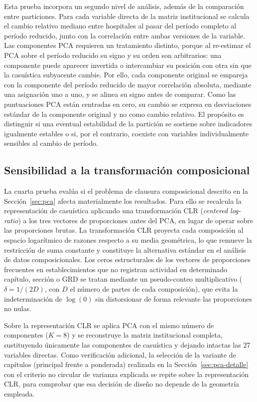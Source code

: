 Esta prueba incorpora un segundo nivel de análisis, además de la comparación
entre particiones. Para cada variable directa de la matriz institucional se
calcula el cambio relativo mediano entre hospitales al pasar del período completo
al período reducido, junto con la correlación entre ambas versiones de la
variable. Las componentes PCA requieren un tratamiento distinto, porque al
re-estimar el PCA sobre el período reducido su signo y su orden son arbitrarios:
una componente puede aparecer invertida o intercambiar su posición con otra sin
que la casuística subyacente cambie. Por ello, cada componente original se
empareja con la componente del período reducido de mayor correlación absoluta,
mediante una asignación uno a uno, y se alinea su signo antes de comparar. Como
las puntuaciones PCA están centradas en cero, su cambio se expresa en
desviaciones estándar de la componente original y no como cambio relativo. El
propósito es distinguir si una eventual estabilidad de la partición se sostiene
sobre indicadores igualmente estables o si, por el contrario, coexiste con
variables individualmente sensibles al cambio de período.

\subsection{Sensibilidad a la transformación composicional}
\label{sec:sensibilidad-composicional}

La cuarta prueba evalúa si el problema de clausura composicional descrito en la
Sección~\ref{sec:pca} afecta materialmente los resultados. Para ello se recalcula
la representación de casuística aplicando una transformación CLR
(\textit{centered log-ratio}) a los tres vectores de proporciones antes del PCA,
en lugar de operar sobre las proporciones brutas. La transformación CLR proyecta
cada composición al espacio logarítmico de razones respecto a su media
geométrica, lo que remueve la restricción de suma constante y constituye la
alternativa estándar en el análisis de datos composicionales. Los ceros
estructurales de los vectores de proporciones frecuentes en establecimientos
que no registran actividad en determinado capítulo, sección o GRD se tratan
mediante un pseudo-conteo multiplicativo ($\delta = 1/(2D)$, con $D$ el número de
partes de cada composición), que evita la indeterminación de $\log(0)$ sin
distorsionar de forma relevante las proporciones no nulas.

Sobre la representación CLR se aplica PCA con el mismo número de componentes
($K=8$) y se reconstruye la matriz institucional completa, sustituyendo
únicamente las componentes de casuística y dejando intactas las 27 variables
directas. Como verificación adicional, la selección de la variante de capítulos
(principal frente a ponderada) realizada en la Sección~\ref{sec:pca-detalle} con
el criterio no circular de varianza explicada se repite sobre la representación
CLR, para comprobar que esa decisión de diseño no depende de la geometría
empleada.

